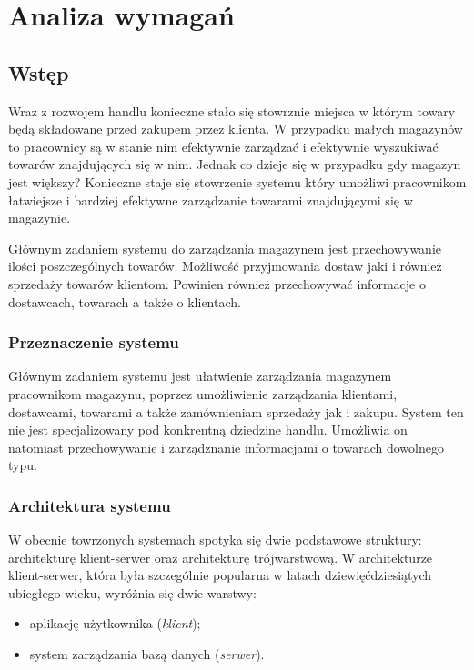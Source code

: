 \chapter{Analiza wymagań}

\section{Wstęp}


Wraz z rozwojem handlu konieczne stało się stowrznie miejsca w którym towary
będą składowane przed zakupem  przez klienta. W przypadku małych magazynów to
pracownicy są w stanie nim efektywnie zarządzać i efektywnie wyszukiwać towarów
znajdujących się w nim. Jednak co dzieje się w przypadku gdy magazyn jest
większy? Konieczne staje się stowrzenie systemu który umożliwi pracownikom
łatwiejsze i bardziej efektywne zarządzanie towarami znajdującymi się w
magazynie.

Głównym zadaniem systemu do zarządzania magazynem jest przechowywanie ilości
poszczególnych towarów. Możliwość przyjmowania dostaw jaki i również sprzedaży
towarów klientom. Powinien również przechowywać informacje o dostawcach,
towarach a także o klientach.

\subsection{Przeznaczenie systemu}

Głównym zadaniem systemu jest ułatwienie zarządzania magazynem pracownikom
magazynu, poprzez umożliwienie zarządzania klientami, dostawcami, towarami a
także zamównieniam sprzedaży jak i zakupu. System ten nie jest specjalizowany
pod konkrentną dziedzine handlu. Umożliwia on natomiast przechowywanie i
zarządznanie informacjami o towarach dowolnego typu. 

\subsection{Architektura systemu}
W obecnie towrzonych systemach spotyka się dwie podstawowe struktury:
architekturę klient-serwer oraz architekturę trójwarstwową.
W architekturze klient-serwer, która była szczególnie popularna w
latach dziewięćdziesiątych ubiegłego wieku, wyróżnia się
dwie warstwy: 
\begin{itemize}
 \item aplikację użytkownika (\emph{klient});
 \item system zarządzania bazą danych (\emph{serwer}).
\end{itemize}

